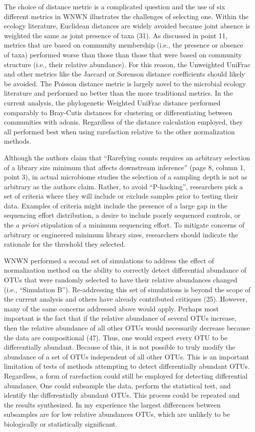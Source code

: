\documentclass[
]{article}
\begin{document}
The choice of distance metric is a complicated question and the use of
six different metrics in WNWN illustrates the challenges of selecting
one. Within the ecology literature, Euclidean distances are widely
avoided because joint absence is weighted the same as joint presence of
taxa (31). As discussed in point 11, metrics that are based on community
membership (i.e., the presence or absence of taxa) performed worse than
those than those that were based on community structure (i.e., their
relative abundance). For this reason, the Unweighted UniFrac and other
metrics like the Jaccard or Sorenson distance coefficients should likely
be avoided. The Poisson distance metric is largely novel to the
microbial ecology literature and performed no better than the more
traditional metrics. In the current analysis, the phylogenetic Weighted
UniFrac distance performed comparably to Bray-Cutis distances for
clustering or differentiating between communities with adonis.
Regardless of the distance calculation employed, they all performed best
when using rarefaction relative to the other normalization methods.

Although the authors claim that ``Rarefying counts requires an arbitrary
selection of a library size minimum that affects downstream inference''
(page 8, column 1, point 3), in actual microbiome studies the selection
of a sampling depth is not as arbitrary as the authors claim. Rather, to
avoid ``P-hacking'', researchers pick a set of criteria where they will
include or exclude samples prior to testing their data. Examples of
criteria might include the presence of a large gap in the sequencing
effort distribution, a desire to include poorly sequenced controls, or
the \emph{a priori} stipulation of a minimum sequencing effort. To
mitigate concerns of arbitrary or engineered minimum library sizes,
researchers should indicate the rationale for the threshold they
selected.

WNWN performed a second set of simulations to address the effect of
normalization method on the ability to correctly detect differential
abundance of OTUs that were randomly selected to have their relative
abundances changed (i.e., ``Simulation B''). Re-addressing this set of
simulations is beyond the scope of the current analysis and others have
already contributed critiques (25). However, many of the same concerns
addressed above would apply. Perhaps most important is the fact that if
the relative abundance of several OTUs increase, then the relative
abundance of all other OTUs would necessarily decrease because the data
are compositional (47). Thus, one would expect every OTU to be
differentially abundant. Because of this, it is not possible to truly
modify the abundance of a set of OTUs independent of all other OTUs.
This is an important limitation of tests of methods attempting to detect
differentially abundant OTUs. Regardless, a form of rarefaction could
still be employed for detecting differential abundance. One could
subsample the data, perform the statistical test, and identify the
differentially abundant OTUs. This process could be repeated and the
results synthesized. In my experience the largest differences between
subsamples are for low relative abundances OTUs, which are unlikely to
be biologically or statistically significant.
\end{document}
